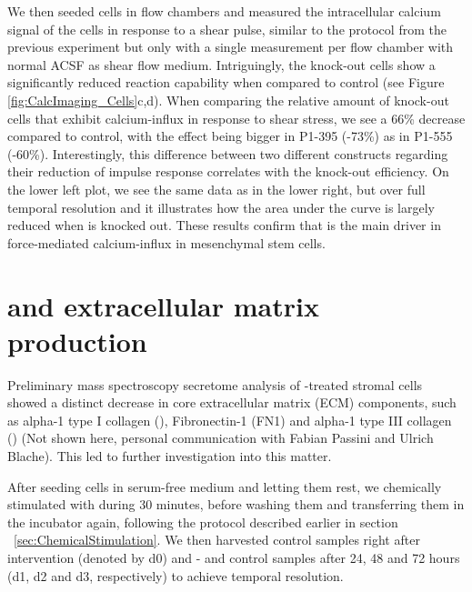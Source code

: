 We then seeded cells in flow chambers and measured the intracellular calcium signal of the cells in response to a shear pulse, similar to the protocol from the previous experiment but only with a single measurement per flow chamber with normal ACSF as shear flow medium. Intriguingly, the \PiezoGene{} knock-out cells show a significantly reduced reaction capability when compared to control (see Figure \ref{fig:CalcImaging_Cells}c,d). When comparing the relative amount of knock-out cells that exhibit calcium-influx in response to shear stress, we see a 66\% decrease compared to control, with the effect being bigger in P1-395 (-73\%) as in P1-555 (-60\%). Interestingly, this difference between two different constructs regarding their reduction of impulse response correlates with the knock-out efficiency. On the lower left plot, we see the same data as in the lower right, but over full temporal resolution and it illustrates how the area under the curve is largely reduced when \Piezo{} is knocked out. 
These results confirm that \Piezo{} is the main driver in force-mediated calcium-influx in mesenchymal stem cells.

\section{\Piezo{} and extracellular matrix production}
\label{sec:PiezoandECM}

Preliminary mass spectroscopy secretome analysis of \Yoda-treated stromal cells showed a distinct decrease in core extracellular matrix (ECM) components, such as alpha-1 type I collagen (\colone), Fibronectin-1 (FN1) and alpha-1 type III collagen (\colthree) (Not shown here, personal communication with Fabian Passini and Ulrich Blache). This led to further investigation into this matter.\par

After seeding cells in serum-free medium and letting them rest, we chemically stimulated \Piezo{} with \Yoda{} during 30 minutes, before washing them and transferring them in the incubator again, following the protocol described earlier in section ~\vref{sec:ChemicalStimulation}. We then harvested control samples right after intervention (denoted by d0) and \Yoda{}- and control samples after 24, 48 and 72 hours (d1, d2 and d3, respectively) to achieve temporal resolution. \par

